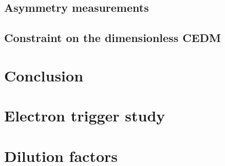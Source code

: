\documentclass[10pt,a4paper,twoside]{report}
\begin{document}
    \section{Asymmetry measurements}
    
    \section{Constraint on the dimensionless CEDM}
    
\chapter{Conclusion}\label{sec:summary}
    
\clearpage

\appendix
\chapter{Electron trigger study}\label{appendix:trigger}
    
\chapter{Dilution factors}\label{appendix:df}
    

\printbibliography[heading=bibintoc]
\end{document}
